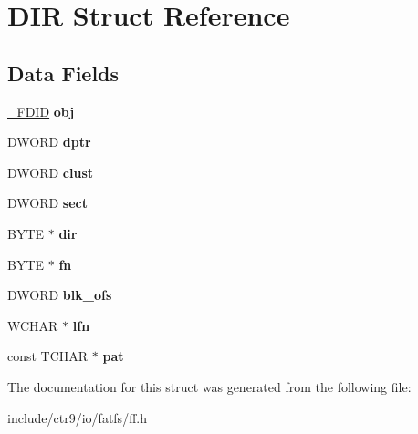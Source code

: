 \hypertarget{struct_d_i_r}{}\section{D\+IR Struct Reference}
\label{struct_d_i_r}
\subsection*{Data Fields}
\begin{DoxyCompactItemize}
\item 
\hyperlink{struct___f_d_i_d}{\+\_\+\+F\+D\+ID} {\bfseries obj}\hypertarget{struct_d_i_r_a5a4848c51616bf4ad90518c211ca3bb3}{}\label{struct_d_i_r_a5a4848c51616bf4ad90518c211ca3bb3}

\item 
D\+W\+O\+RD {\bfseries dptr}\hypertarget{struct_d_i_r_a0330e9554e1f38795debe4495156873e}{}\label{struct_d_i_r_a0330e9554e1f38795debe4495156873e}

\item 
D\+W\+O\+RD {\bfseries clust}\hypertarget{struct_d_i_r_acfbb8ba2d6e73b6f999ceffd1857c190}{}\label{struct_d_i_r_acfbb8ba2d6e73b6f999ceffd1857c190}

\item 
D\+W\+O\+RD {\bfseries sect}\hypertarget{struct_d_i_r_ad01fcc812ed0dad11a593574336adc9e}{}\label{struct_d_i_r_ad01fcc812ed0dad11a593574336adc9e}

\item 
B\+Y\+TE $\ast$ {\bfseries dir}\hypertarget{struct_d_i_r_a6c2a8c0cf2d55ae99775e93a16593449}{}\label{struct_d_i_r_a6c2a8c0cf2d55ae99775e93a16593449}

\item 
B\+Y\+TE $\ast$ {\bfseries fn}\hypertarget{struct_d_i_r_a32da2f31d6c3b6c42eef981cb0cfd2ee}{}\label{struct_d_i_r_a32da2f31d6c3b6c42eef981cb0cfd2ee}

\item 
D\+W\+O\+RD {\bfseries blk\+\_\+ofs}\hypertarget{struct_d_i_r_afdb5d6302a88eaf5d43da0352ca2cc91}{}\label{struct_d_i_r_afdb5d6302a88eaf5d43da0352ca2cc91}

\item 
W\+C\+H\+AR $\ast$ {\bfseries lfn}\hypertarget{struct_d_i_r_af62fd789383e6f1397f74617e11c135d}{}\label{struct_d_i_r_af62fd789383e6f1397f74617e11c135d}

\item 
const T\+C\+H\+AR $\ast$ {\bfseries pat}\hypertarget{struct_d_i_r_a1f636884096de91deb97f59209d60e96}{}\label{struct_d_i_r_a1f636884096de91deb97f59209d60e96}

\end{DoxyCompactItemize}


The documentation for this struct was generated from the following file\+:\begin{DoxyCompactItemize}
\item 
include/ctr9/io/fatfs/ff.\+h\end{DoxyCompactItemize}
